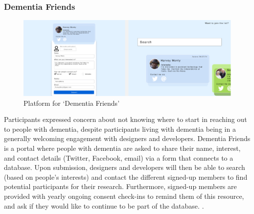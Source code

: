 \subsubsection{Dementia Friends}
\begin{figure}[h]
\centering
\includegraphics[width=1\linewidth]{Images/D3Toolkit/Fig6.png}
\caption{Platform for `Dementia Friends'}
\label{fig:DementiaFriends}
\end{figure}
Participants expressed concern about not knowing where to start in reaching out to people with dementia, despite participants living with dementia being in a generally welcoming engagement with designers and developers. Dementia Friends is a portal where people with dementia are asked to share their name, interest, and contact details (Twitter, Facebook, email) via a form that connects to a database. Upon submission, designers and developers will then be able to search (based on people's interests) and contact the different signed-up members to find potential participants for their research. Furthermore, signed-up members are provided with yearly ongoing consent check-ins to remind them of this resource, and ask if they would like to continue to be part of the database. .

